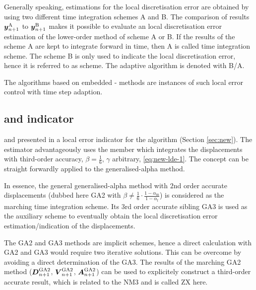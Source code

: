 Generally speaking, estimations for the local discretisation error are
obtained by using two different time integration schemes A and B\@. 
The
comparison of results $\boldsymbol{y}_{n+1}^\text{A}$ to
$\boldsymbol{y}_{n+1}^\text{B}$ makes it possible to evaluate an local discretisation error estimation of
the lower-order method of scheme A or B\@. If
the results of the scheme A are kept to integrate forward 
in time, then A is called  time integration scheme. The scheme
B is only used to indicate the local discretisation error, hence it is referred to as
 scheme. The adaptive algorithm is denoted with B/A\@. 

The algorithms based on 
embedded - methods are instances of such local error
control with time step adaption.

\subsection{ and  indicator}\label{sec:zx}
 and  presented in \cite{zienkiewicz91} a local
error indicator for the  algorithm (Section
\ref{sec:new})\@. The estimator advantageously uses the member which
integrates the displacements with third-order accuracy, \ie{}
$\beta=\frac{1}{6}$, $\gamma$ arbitrary, \cf{} \eqref{eq:new-lde-1}\@. The concept can be straight forwardly applied to the generalised-alpha method.

In essence, the general generalised-alpha method with $2$nd order accurate displacements (dubbed here GA2 with $\beta\neq\frac{1}{6}\cdot\frac{1-\alpha_\text{m}}{1-\alpha_\text{f}}$) is considered as the marching time integration scheme. Its $3$rd order accurate sibling GA3 is used as the auxiliary scheme to eventually obtain the
local discretisation error estimation/indication of the displacements. 

The GA2 and GA3 methods are implicit schemes, hence a
direct calculation with GA2 and GA3 would require two
iterative solutions. This can be overcome by avoiding a direct determination
of the GA3\@.
The results of the marching GA2 method ($\boldsymbol{D}_{n+1}^\text{GA2}$,
$\boldsymbol{V}_{n+1}^\text{GA2}$, $\boldsymbol{A}_{n+1}^\text{GA2}$) can be used
to explicitely construct a third-order accurate result, which is related to
the NM3 and is called ZX here\@. 

